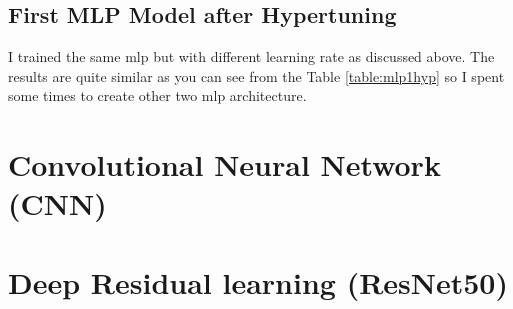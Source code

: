 \subsection{First MLP Model after Hypertuning}
I trained the same mlp but with different learning rate as discussed above.
The results are quite similar as you can see from the Table \ref{table:mlp1hyp} so I spent some times to create other two mlp architecture.
\section{Convolutional Neural Network (CNN)}
\section{Deep Residual learning (ResNet50)}